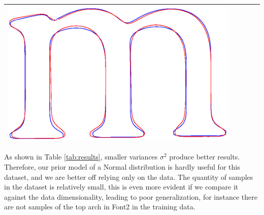 \documentclass[12pt]{article}
\begin{document}
\begin{center}
\begin{table}[h]
\begin{tabular}{|c|c|c|c|c|}
\includegraphics[scale = 0.2]{images/f3var0_01} \\ \hline
\end{tabular}
\end{table}
\end{center}

As shown in Table \ref{tab:results}, smaller variances $\sigma^2$ produce better results.
Therefore, our prior model of a Normal distribution is hardly useful for this dataset, and we are better off relying only on the data.
The quantity of samples in the dataset is relatively small, this is even more evident if we compare it against the data dimensionality, leading to poor generalization, for instance there are not samples of the top arch in Font2 in the training data. 
\end{document}
